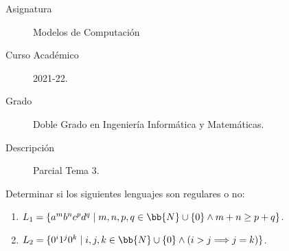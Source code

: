 \documentclass[12pt]{article}
\begin{document}

    
    

    \begin{description}
        \item[Asignatura] Modelos de Computación
        \item[Curso Académico] 2021-22.
        \item[Grado] Doble Grado en Ingeniería Informática y Matemáticas.
        \item[Descripción] Parcial Tema 3.
    \end{description}
    \newpage
    
    \begin{ejercicio}
        Determinar si los siguientes lenguajes son regulares o no:
        \begin{enumerate}
            \item $L_1=\{a^m b^n c^p d^q\mid m,n,p,q\in \bb{N}\cup \{0\} \land m+n\geq p+q\}$.
            \item $L_2=\{0^i 1^j 0^k \mid i,j,k\in \bb{N}\cup \{0\} \land \left(i>j\Longrightarrow j=k\right)\}$.
        \end{enumerate}
    \end{ejercicio}
\end{document}
